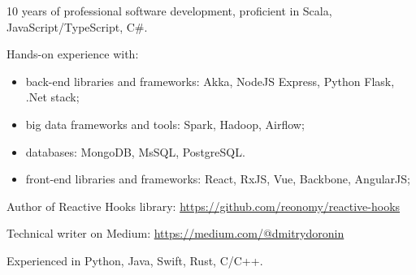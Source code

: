 \documentclass{resume}
\begin{document}

\begin{rSection}{}
10 years of professional software development, proficient in Scala, JavaScript/TypeScript, C\#.

\item Hands-on experience with:
\begin{itemize}
      \item back-end libraries and frameworks: 
            Akka, NodeJS Express, Python Flask, .Net stack;
      \item big data frameworks and tools:
            Spark, Hadoop, Airflow;
      \item databases:
            MongoDB, MsSQL, PostgreSQL.
      \item front-end libraries and frameworks: 
            React, RxJS, Vue, Backbone, AngularJS;
\end{itemize}

\item Author of Reactive Hooks library: \url{https://github.com/reonomy/reactive-hooks}
\item Technical writer on Medium: \url{https://medium.com/@dmitrydoronin}
\item Experienced in Python, Java, Swift, Rust, C/C++.

\end{rSection}

\end{document}
